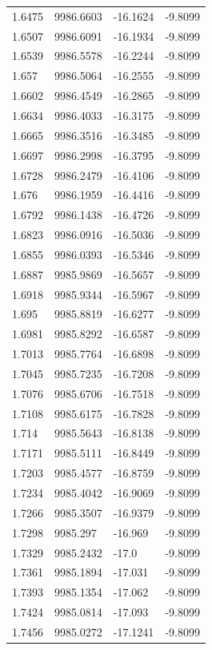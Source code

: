 \begin{table}[H]
\begin{tabular}{llll}
1.6475 & 9986.6603 & -16.1624 & -9.8099 \\
1.6507 & 9986.6091 & -16.1934 & -9.8099 \\
1.6539 & 9986.5578 & -16.2244 & -9.8099 \\
1.657 & 9986.5064 & -16.2555 & -9.8099 \\
1.6602 & 9986.4549 & -16.2865 & -9.8099 \\
1.6634 & 9986.4033 & -16.3175 & -9.8099 \\
1.6665 & 9986.3516 & -16.3485 & -9.8099 \\
1.6697 & 9986.2998 & -16.3795 & -9.8099 \\
1.6728 & 9986.2479 & -16.4106 & -9.8099 \\
1.676 & 9986.1959 & -16.4416 & -9.8099 \\
1.6792 & 9986.1438 & -16.4726 & -9.8099 \\
1.6823 & 9986.0916 & -16.5036 & -9.8099 \\
1.6855 & 9986.0393 & -16.5346 & -9.8099 \\
1.6887 & 9985.9869 & -16.5657 & -9.8099 \\
1.6918 & 9985.9344 & -16.5967 & -9.8099 \\
1.695 & 9985.8819 & -16.6277 & -9.8099 \\
1.6981 & 9985.8292 & -16.6587 & -9.8099 \\
1.7013 & 9985.7764 & -16.6898 & -9.8099 \\
1.7045 & 9985.7235 & -16.7208 & -9.8099 \\
1.7076 & 9985.6706 & -16.7518 & -9.8099 \\
1.7108 & 9985.6175 & -16.7828 & -9.8099 \\
1.714 & 9985.5643 & -16.8138 & -9.8099 \\
1.7171 & 9985.5111 & -16.8449 & -9.8099 \\
1.7203 & 9985.4577 & -16.8759 & -9.8099 \\
1.7234 & 9985.4042 & -16.9069 & -9.8099 \\
1.7266 & 9985.3507 & -16.9379 & -9.8099 \\
1.7298 & 9985.297 & -16.969 & -9.8099 \\
1.7329 & 9985.2432 & -17.0 & -9.8099 \\
1.7361 & 9985.1894 & -17.031 & -9.8099 \\
1.7393 & 9985.1354 & -17.062 & -9.8099 \\
1.7424 & 9985.0814 & -17.093 & -9.8099 \\
1.7456 & 9985.0272 & -17.1241 & -9.8099 \\

\end{tabular}
\end{table}
